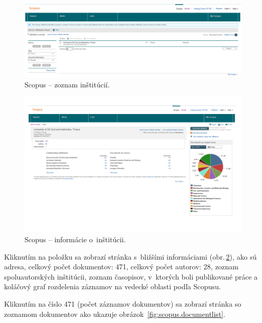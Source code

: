 \begin{figure}
  \centering
  \includegraphics[width=\textwidth]{obr/scopus02-cut.jpg}
  \caption{Scopus -- zoznam inštitúcií.}
  \label{fig:scopus.institutionlist}
\end{figure}

\begin{figure}
  \centering
  \includegraphics[width=\textwidth]{obr/scopus03-cut.jpg}
  \caption{Scopus -- informácie o~inštitúcii.}
  \label{fig:scopus.institutioninfo}
\end{figure}

Kliknutím na položku sa zobrazí stránka s~bližšími informáciami
(obr.\,\ref{fig:scopus.institutioninfo}), ako sú adresa, celkový počet
dokumentov: 471, celkový počet autorov: 28, zoznam spoluautorských inštitúcii,
zoznam časopisov, v~ktorých boli publikované práce a koláčový graf rozdelenia
záznamov na vedecké oblasti podľa Scopusu.

Kliknutím na číslo 471 (počet záznamov dokumentov) sa zobrazí stránka so
zoznamom dokumentov ako ukazuje obrázok~\ref{fig:scopus.documentlist}.

